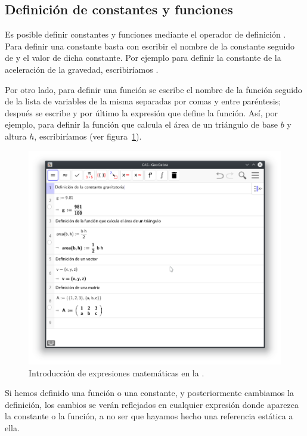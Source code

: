 \subsection*{Definición de constantes y funciones}
Es posible definir constantes y funciones mediante el operador de definición \command{:=}.
Para definir una constante basta con escribir el nombre de la constante seguido de \command{:=} y el valor de dicha constante.
Por ejemplo para definir la constante de la aceleración de la gravedad, escribiríamos .

Por otro lado, para definir una función se escribe el nombre de la función seguido de la lista de variables de la misma separadas por comas y entre paréntesis; después se escribe \command{:=} y por último la expresión que define la función.
Así, por ejemplo, para definir la función que calcula el área de un triángulo de base $b$ y altura $h$, escribiríamos  (ver figura~\ref{g:expresiones}).

\begin{figure}[h!]
\begin{center}
\includegraphics[scale=0.6]{img/introduccion/math-expressions}
\caption{Introducción de expresiones matemáticas en la .} \label{g:expresiones}
\end{center}
\end{figure}

Si hemos definido una función o una constante, y posteriormente cambiamos la definición, los cambios se verán reflejados en cualquier expresión donde aparezca la constante o la función, a no ser que hayamos hecho una referencia estática a ella.

